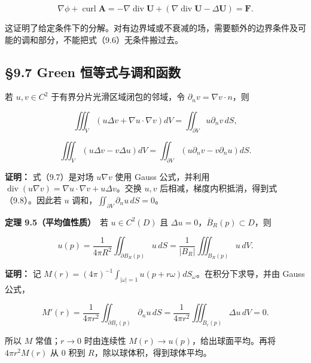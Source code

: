 \documentclass[11pt,a4paper]{article}
\begin{document}
\begin{equation*}
 \nabla\phi+\operatorname{curl}\mathbf A
 =-\nabla\operatorname{div}\mathbf U+
   (\nabla\operatorname{div}\mathbf U-\Delta\mathbf U)=\mathbf F.
\end{equation*}

这证明了给定条件下的分解。对有边界域或不衰减的场，需要额外的边界条件及可能的调和部分，不能把式（9.6）无条件搬过去。

\subsection{§9.7 Green
恒等式与调和函数}\label{green-ux6052ux7b49ux5f0fux4e0eux8c03ux548cux51fdux6570}

若 \(u,v\in C^2\) 于有界分片光滑区域闭包的邻域，令
\(\partial_n v=\nabla v\cdot n\)，则

\begin{equation*}
 \iiint_V(u\Delta v+\nabla u\cdot\nabla v)dV
 =\iint_{\partial V}u\partial_nv\,dS,\tag{9.7}
\end{equation*}

\begin{equation*}
 \iiint_V(u\Delta v-v\Delta u)dV
 =\iint_{\partial V}(u\partial_nv-v\partial_nu)dS.\tag{9.8}
\end{equation*}

\textbf{证明：} 式（9.7）是对场 \(u\nabla v\) 使用 Gauss 公式，并利用
\(\operatorname{div}(u\nabla v)=\nabla u\cdot\nabla v+u\Delta v\)。交换
\(u,v\) 后相减，梯度内积抵消，得到式（9.8）。因此若 \(u\)
调和，\(\iint_{\partial V}\partial_nu\,dS=0\)。

\textbf{定理 9.5（平均值性质）}　若 \(u\in C^2(D)\) 且
\(\Delta u=0\)，\(\overline B_R(p)\subset D\)，则

\begin{equation*}
 u(p)=\frac1{4\pi R^2}\iint_{\partial B_R(p)}u\,dS
 =\frac1{|B_R|}\iiint_{B_R(p)}u\,dV.\tag{9.9}
\end{equation*}

\textbf{证明：} 记
\(M(r)=(4\pi)^{-1}\int_{|\omega|=1}u(p+r\omega)dS_\omega\)。在积分下求导，并由
Gauss 公式，

\begin{equation*}
 M'(r)=\frac1{4\pi r^2}\iint_{\partial B_r(p)}\partial_nu\,dS
 =\frac1{4\pi r^2}\iiint_{B_r(p)}\Delta u\,dV=0.
\end{equation*}

所以 \(M\) 常值；\(r\to0\) 时由连续性
\(M(r)\to u(p)\)，给出球面平均。再将 \(4\pi r^2M(r)\) 从 \(0\) 积到
\(R\)，除以球体积，得到球体平均。
\end{document}
